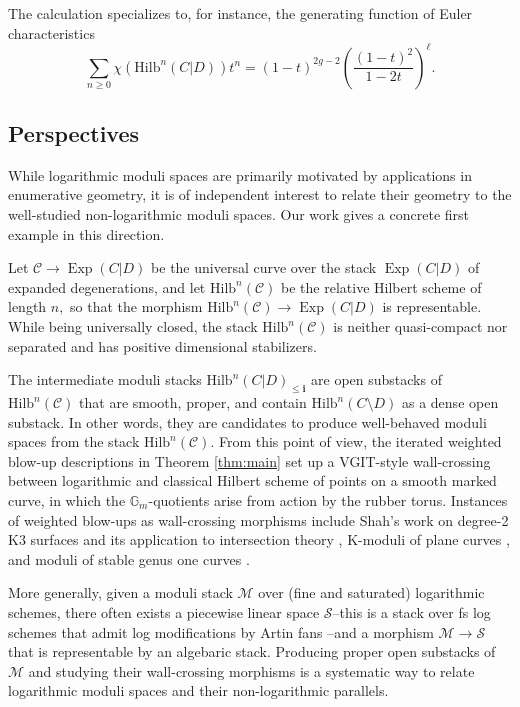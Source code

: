\documentclass[10.5pt]{amsart}
\theoremstyle{definition}
\theoremstyle{definition}
\theoremstyle{definition}
\theoremstyle{definition}
\newcommand{\Exp}{\operatorname{Exp}}
\newcommand{\Hilb}{\mathrm{Hilb}}
\newcommand{\bi}{\boldsymbol{i}}
\begin{document}
The calculation specializes to, for instance, the generating function of Euler characteristics $$\sum_{n\geq 0}\chi(\Hilb^n(C|D)) t^n = (1-t)^{2g-2} \left(\frac{(1-t)^2}{1-2t}\right)^{\ell}.$$

\subsection{Perspectives}
{While logarithmic moduli spaces are primarily motivated by applications in enumerative geometry, it is of independent interest to relate their geometry to the well-studied non-logarithmic moduli spaces. Our work gives a concrete first example in this direction.}

\label{subsec:modexp}
Let $\mathscr{C}\to \Exp(C|D)$ be the universal curve over the stack $\Exp(C|D)$ of expanded degenerations, and let $\Hilb^n(\mathscr{C})$ be the relative Hilbert scheme of length $n,$ so that the morphism $\Hilb^n(\mathscr{C})\to \Exp(C|D)$ is representable. While being universally closed, the stack $\Hilb^n(\mathscr{C})$ is neither quasi-compact nor separated and has positive dimensional stabilizers. 

The intermediate moduli stacks $\Hilb^n(C|D)_{\leq \bi}$ are open substacks of $\Hilb^n(\mathscr{C})$ that are smooth, proper, and contain $\Hilb^n(C\setminus D)$ as a dense open substack. {In other words, they are candidates to produce well-behaved moduli spaces from the stack $\Hilb^n(\mathscr{C}).$ From this point of view, the iterated weighted blow-up descriptions in Theorem \ref{thm:main} set up a VGIT-style wall-crossing between logarithmic and classical Hilbert scheme of points on a smooth marked curve, in which the $\mathbb{G}_m$-quotients arise from action by the rubber torus.} Instances of weighted blow-ups as wall-crossing morphisms include Shah's work on degree-2 K3 surfaces \cite{Shah} and its application to intersection theory \cite{COP}, K-moduli of plane curves \cite{ADL}, and moduli of stable genus one curves \cite[§7]{arena2024criterion}.

More generally, given a moduli stack $\mathscr{M}$ over (fine and saturated) logarithmic schemes, there often exists a piecewise linear space $\mathscr{S}$--this is a stack over fs log schemes that admit log modifications by Artin fans \cite{logquot}--and a morphism $\mathscr{M}\to \mathscr{S}$ that is representable by an algebaric stack. Producing proper open substacks of $\mathscr{M}$ and studying their wall-crossing morphisms is a systematic way to relate logarithmic moduli spaces and their non-logarithmic parallels.
\end{document}
